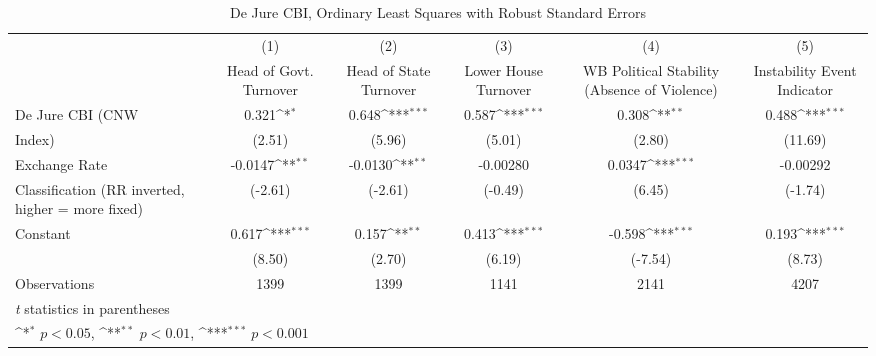 \begin{table}[htbp]\centering
\def\sym#1{\ifmmode^{#1}\else\(^{#1}\)\fi}
\caption{De Jure CBI, Ordinary Least Squares with Robust Standard Errors \label{multIndOLSDJ}}
\begin{tabular}{l*{5}{c}}
\toprule
                &\multicolumn{1}{c}{(1)}&\multicolumn{1}{c}{(2)}&\multicolumn{1}{c}{(3)}&\multicolumn{1}{c}{(4)}&\multicolumn{1}{c}{(5)}\\
                &\multicolumn{1}{c}{Head of Govt. Turnover}&\multicolumn{1}{c}{Head of State Turnover}&\multicolumn{1}{c}{Lower House Turnover}&\multicolumn{1}{c}{WB Political Stability (Absence of Violence)}&\multicolumn{1}{c}{Instability Event Indicator}\\
\midrule
De Jure CBI (CNW&    0.321\sym{*}  &    0.648\sym{***}&    0.587\sym{***}&    0.308\sym{**} &    0.488\sym{***}\\
Index)          &   (2.51)         &   (5.96)         &   (5.01)         &   (2.80)         &  (11.69)         \\
\addlinespace
Exchange Rate   &  -0.0147\sym{**} &  -0.0130\sym{**} & -0.00280         &   0.0347\sym{***}& -0.00292         \\
Classification (RR inverted, higher = more fixed)&  (-2.61)         &  (-2.61)         &  (-0.49)         &   (6.45)         &  (-1.74)         \\
\addlinespace
Constant        &    0.617\sym{***}&    0.157\sym{**} &    0.413\sym{***}&   -0.598\sym{***}&    0.193\sym{***}\\
                &   (8.50)         &   (2.70)         &   (6.19)         &  (-7.54)         &   (8.73)         \\
\midrule
Observations    &     1399         &     1399         &     1141         &     2141         &     4207         \\
\bottomrule
\multicolumn{6}{l}{\footnotesize \textit{t} statistics in parentheses}\\
\multicolumn{6}{l}{\footnotesize \sym{*} \(p<0.05\), \sym{**} \(p<0.01\), \sym{***} \(p<0.001\)}\\
\end{tabular}
\end{table}
